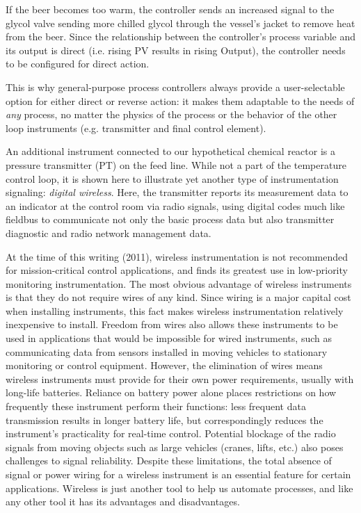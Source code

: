 If the beer becomes too warm, the controller sends an increased signal to the glycol valve sending more chilled glycol through the vessel's jacket to remove heat from the beer.  Since the relationship between the controller's process variable and its output is direct (i.e. rising PV results in rising Output), the controller needs to be configured for direct action.

This is why general-purpose process controllers always provide a user-selectable option for either direct or reverse action: it makes them adaptable to the needs of \textit{any} process, no matter the physics of the process or the behavior of the other loop instruments (e.g. transmitter and final control element).

\vskip 10pt

\filbreak

An additional instrument connected to our hypothetical chemical reactor is a pressure transmitter (PT) on the feed line.  While not a part of the temperature control loop, it is shown here to illustrate yet another type of instrumentation signaling: \textit{digital wireless}.  Here, the transmitter reports its measurement data to an indicator at the control room via radio signals, using digital codes much like fieldbus to communicate not only the basic process data but also transmitter diagnostic and radio network management data.

At the time of this writing (2011), wireless instrumentation is not recommended for mission-critical control applications, and finds its greatest use in low-priority monitoring instrumentation.  The most obvious advantage of wireless instruments is that they do not require wires of any kind.  Since wiring is a major capital cost when installing instruments, this fact makes wireless instrumentation relatively inexpensive to install.  Freedom from wires also allows these instruments to be used in applications that would be impossible for wired instruments, such as communicating data from sensors installed in moving vehicles to stationary monitoring or control equipment.  However, the elimination of wires means wireless instruments must provide for their own power requirements, usually with long-life batteries.  Reliance on battery power alone places restrictions on how frequently these instrument perform their functions: less frequent data transmission results in longer battery life, but correspondingly reduces the instrument's practicality for real-time control.  Potential blockage of the radio signals from moving objects such as large vehicles (cranes, lifts, etc.) also poses challenges to signal reliability.  Despite these limitations, the total absence of signal or power wiring for a wireless instrument is an essential feature for certain applications.  Wireless is just another tool to help us automate processes, and like any other tool it has its advantages and disadvantages.





